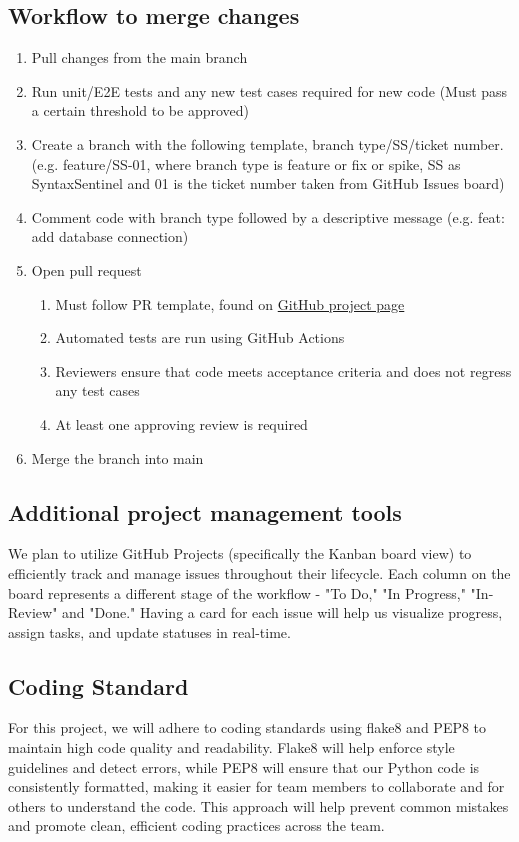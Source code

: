 \documentclass{article}
\begin{document}
\subsection{Workflow to merge changes}
\begin{enumerate}
    \item Pull changes from the main branch
    \item Run unit/E2E tests and any new test cases required for new code (Must pass a certain threshold to be approved)
    \item Create a branch with the following template, branch type/SS/ticket number. (e.g. feature/SS-01, where branch type is feature or fix or spike, SS as SyntaxSentinel and 01 is the ticket number taken from GitHub Issues board)
    \item Comment code with branch type followed by a descriptive message (e.g. feat: add database connection)
    \item Open pull request
        \begin{enumerate}
            \item Must follow PR template, found on \href{https://github.com/lilweege/SyntaxSentinels/blob/main/.github/pull_request_template.md}{GitHub project page}
            \item Automated tests are run using GitHub Actions
            \item Reviewers ensure that code meets acceptance criteria and does not regress any test cases
            \item At least one approving review is required
        \end{enumerate}
    \item Merge the branch into main
\end{enumerate}


\subsection{Additional project management tools}

We plan to utilize GitHub Projects (specifically the Kanban board view) to 
efficiently track and manage issues throughout their lifecycle. Each column 
on the board represents a different stage of the workflow - "To Do," 
"In Progress," "In-Review" and "Done." Having a card for each issue will help us 
visualize progress, assign tasks, and update statuses in real-time.

\subsection{Coding Standard}
For this project, we will adhere to coding standards using flake8 and PEP8 to 
maintain high code quality and readability. Flake8 will help enforce style 
guidelines and detect errors, while PEP8 will ensure that our Python code is 
consistently formatted, making it easier for team members to collaborate and 
for others to understand the code. This approach will help prevent common 
mistakes and promote clean, efficient coding practices across the team.
\end{document}
